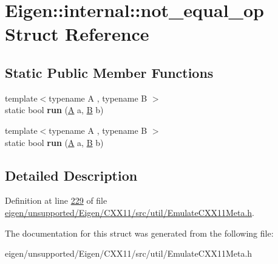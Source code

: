 \hypertarget{struct_eigen_1_1internal_1_1not__equal__op}{}\section{Eigen\+:\+:internal\+:\+:not\+\_\+equal\+\_\+op Struct Reference}
\label{struct_eigen_1_1internal_1_1not__equal__op}
\subsection*{Static Public Member Functions}
\begin{DoxyCompactItemize}
\item 
\mbox{\label{struct_eigen_1_1internal_1_1not__equal__op_a90b0e78ae0a38031197c4f39e5f55805}} 
{\footnotesize template$<$typename A , typename B $>$ }\\static bool {\bfseries run} (\hyperlink{group___core___module_class_eigen_1_1_matrix}{A} a, \hyperlink{group___core___module_class_eigen_1_1_matrix}{B} b)
\item 
\mbox{\label{struct_eigen_1_1internal_1_1not__equal__op_a90b0e78ae0a38031197c4f39e5f55805}} 
{\footnotesize template$<$typename A , typename B $>$ }\\static bool {\bfseries run} (\hyperlink{group___core___module_class_eigen_1_1_matrix}{A} a, \hyperlink{group___core___module_class_eigen_1_1_matrix}{B} b)
\end{DoxyCompactItemize}


\subsection{Detailed Description}


Definition at line \hyperlink{eigen_2unsupported_2_eigen_2_c_x_x11_2src_2util_2_emulate_c_x_x11_meta_8h_source_l00229}{229} of file \hyperlink{eigen_2unsupported_2_eigen_2_c_x_x11_2src_2util_2_emulate_c_x_x11_meta_8h_source}{eigen/unsupported/\+Eigen/\+C\+X\+X11/src/util/\+Emulate\+C\+X\+X11\+Meta.\+h}.



The documentation for this struct was generated from the following file\+:\begin{DoxyCompactItemize}
\item 
eigen/unsupported/\+Eigen/\+C\+X\+X11/src/util/\+Emulate\+C\+X\+X11\+Meta.\+h\end{DoxyCompactItemize}
